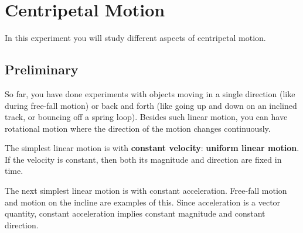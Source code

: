 \setcounter{chapter}{9}
\chapter{Centripetal Motion}
In this experiment you will study different aspects of centripetal motion.
\section{Preliminary}
So far, you have done experiments with objects moving in a single direction (like during free-fall motion) or back and forth (like going up and down on an inclined track, or bouncing off a spring loop). Besides such linear motion, you can have rotational motion where the direction of the motion changes continuously.

The simplest linear motion is with \textbf{constant velocity}: \textbf{uniform linear motion}. If the velocity is constant, then both its magnitude and direction are fixed in time.

The next simplest linear motion is with constant acceleration. Free-fall motion and motion on the incline are examples of this. Since acceleration is a vector quantity, constant acceleration implies constant magnitude and constant direction.

